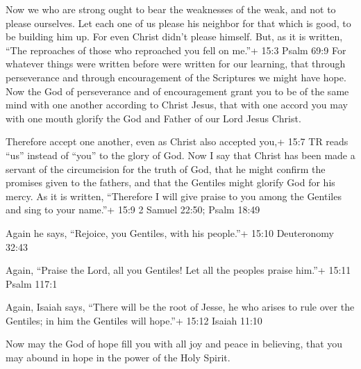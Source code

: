  Now we who are strong ought to bear the weaknesses of the
weak, and not to please ourselves.  Let each one of us
please his neighbor for that which is good, to be building him up.
 For even Christ didn't please himself. But, as it is
written, ``The reproaches of those who reproached you fell on me.''+
15:3 Psalm 69:9  For whatever things were written before
were written for our learning, that through perseverance and through
encouragement of the Scriptures we might have hope.  Now the
God of perseverance and of encouragement grant you to be of the same
mind with one another according to Christ Jesus,  that with
one accord you may with one mouth glorify the God and Father of our Lord
Jesus Christ.

 Therefore accept one another, even as Christ also accepted
you,+ 15:7 TR reads ``us'' instead of ``you'' to the glory of God.
 Now I say that Christ has been made a servant of the
circumcision for the truth of God, that he might confirm the promises
given to the fathers,  and that the Gentiles might glorify
God for his mercy. As it is written, ``Therefore I will give praise to
you among the Gentiles and sing to your name.''+ 15:9 2 Samuel 22:50;
Psalm 18:49

 Again he says, ``Rejoice, you Gentiles, with his
people.''+ 15:10 Deuteronomy 32:43

 Again, ``Praise the Lord, all you Gentiles! Let all the
peoples praise him.''+ 15:11 Psalm 117:1

 Again, Isaiah says, ``There will be the root of Jesse, he
who arises to rule over the Gentiles; in him the Gentiles will hope.''+
15:12 Isaiah 11:10

 Now may the God of hope fill you with all joy and peace in
believing, that you may abound in hope in the power of the Holy Spirit.

